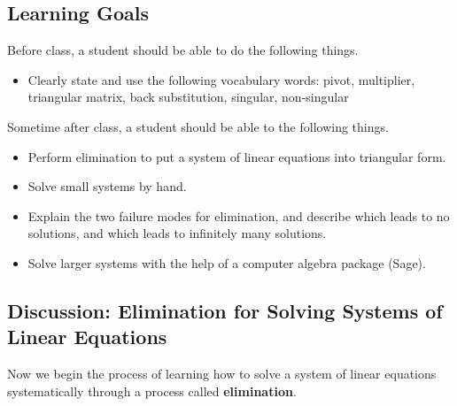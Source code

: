 \documentclass[10pt,]{book}
\newcommand{\terminology}[1]{\textbf{#1}}
\theoremstyle{plain}
\numberwithin{equation}{section}
\begin{document}
\subsection[Learning Goals]{Learning Goals}\label{subsection-25}

      Before class, a student should be able to do the following things.
\begin{itemize}
\item{}Clearly state and use the following vocabulary words: pivot, multiplier,
        triangular matrix, back substitution, singular, non-singular
      \end{itemize}
\par

      Sometime after class, a student should be able to the following things.
\begin{itemize}
\item{}Perform elimination to put a system of linear equations into triangular form.\item{}Solve small systems by hand.\item{}Explain the two failure modes for elimination, and describe which leads to
        no solutions, and which leads to infinitely many solutions.\item{}Solve larger systems with the help of a computer algebra package (Sage).\end{itemize}
\typeout{************************************************}
\typeout{************************************************}
\subsection[Discussion: Elimination for Solving Systems of Linear Equations]{Discussion: Elimination for Solving Systems of Linear Equations}\label{subsection-26}

        Now we begin the process of learning how to solve a system of linear
        equations systematically through a process called \terminology{elimination}.
\typeout{************************************************}
\typeout{************************************************}
\end{document}
